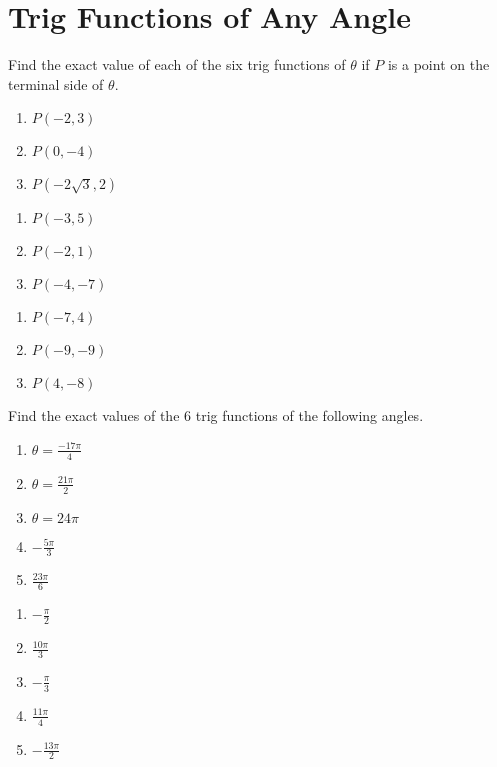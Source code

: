 \chapter{Trig Functions of Any Angle}

Find the exact value of each of the six trig functions of $\theta$ if $P$ is a point on the terminal side of $\theta$.

\begin{multicols}{3}
\begin{enumerate}
	\item $P(-2, 3)$
	\item $P(0,-4)$
	\item $P(-2\sqrt{3}, 2)$
\end{enumerate} \setcounter{Review}{\value{enumi}}
\end{multicols}
\begin{multicols}{3}
\begin{enumerate}	\setcounter{enumi}{\value{Review}}
	\item $P(-3, 5)$
	\item $P(-2, 1)$
	\item $P(-4, -7)$
\end{enumerate}	\setcounter{Review}{\value{enumi}}
\end{multicols}
\begin{multicols}{3}
\begin{enumerate}	\setcounter{enumi}{\value{Review}}
	\item $P(-7, 4)$
	\item $P(-9, -9)$
	\item $P(4, -8)$
\end{enumerate}	\setcounter{Review}{\value{enumi}}
\end{multicols}
\bigskip 

Find the exact values of the 6 trig functions of the following angles.

\begin{multicols}{5}
\begin{enumerate}		\setcounter{enumi}{\value{Review}}	
	\item $\theta = \frac{-17\pi}{4}$	
	\item $\theta = \frac{21\pi}{2}$	
	\item $\theta = 24\pi$  
	\item $-\frac{5\pi}{3}$	
    \item $\frac{23\pi}{6}$	
\end{enumerate} \setcounter{Review}{\value{enumi}}
\end{multicols}
\smallskip
\begin{multicols}{5}
\begin{enumerate}	\setcounter{enumi}{\value{Review}}
    \item $-\frac{\pi}{2}$
    \item $\frac{10\pi}{3}$
    \item $-\frac{\pi}{3}$
    \item $\frac{11\pi}{4}$
    \item $-\frac{13\pi}{2}$
\end{enumerate}
\end{multicols}


